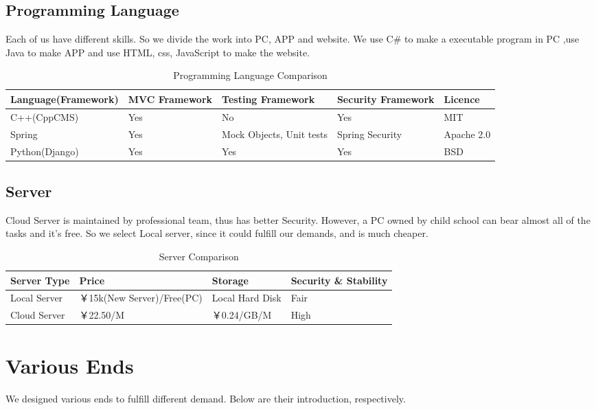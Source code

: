 \documentclass{article}
\begin{document}
\subsection{Programming Language}
Each of us have different skills. So we divide the work into PC, APP and website. We use C\# to make a executable program in PC ,use Java to make APP and use HTML, css, JavaScript to make the website.

\begin{table}[htbp]
\centering
  \begin{tabular}{|l|p{2cm}|p{2cm}|p{2cm}|p{2cm}|}
  \hline
   Language(Framework) & MVC Framework & Testing Framework & Security Framework & Licence\\
    \hline
   C++(CppCMS) & Yes & No & Yes & MIT\\
    \hline

   Spring & Yes & Mock Objects, Unit tests & Spring Security & Apache 2.0\\
       \hline

   Python(Django) & Yes & Yes & Yes & BSD \\   
	\hline
     \end{tabular}
  \caption{Programming Language Comparison}
\end{table}

\subsection{Server}
Cloud Server is maintained by professional team, thus has better Security. However, a PC owned by child school can bear almost all of the tasks and it's free. So we select Local server, since it could fulfill our demands, and is much cheaper.

\begin{table}[htbp]
\centering
\begin{tabular}{|l|l|l|l|}
	\hline
	Server Type & Price & Storage & Security \& Stability \\
	\hline
	Local Server & ￥15k(New Server)/Free(PC) & Local Hard Disk & Fair \\
	\hline
	Cloud Server & ￥22.50/M & ￥0.24/GB/M & High \\
	\hline
	
\end{tabular}
	\caption{Server Comparison}
\end{table}

\section{Various Ends}
We designed various ends to fulfill different demand. Below are their introduction, respectively.
\end{document}
